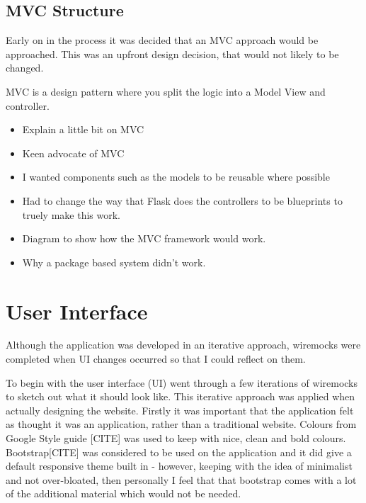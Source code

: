 

\subsection{MVC Structure}
Early on in the process it was decided that an MVC approach would be approached. This was an upfront design decision, that would not likely to be changed.

MVC is a design pattern where you split the logic into a Model View and controller.

\begin{itemize}
  \item Explain a little bit on MVC
  \item Keen advocate of MVC
  \item I wanted components such as the models to be reusable where possible
  \item Had to change the way that Flask does the controllers to be blueprints to truely make this work.
  \item Diagram to show how the MVC framework would work.
  \item Why a package based system didn't work.

\end{itemize}




\section{User Interface}
Although the application was developed in an iterative approach, wiremocks were completed when UI changes occurred so that I could reflect on them.

To begin with the user interface (UI) went through a few iterations of wiremocks to sketch out what it should look like.  This iterative approach was applied when actually designing the website. Firstly it was important that the application felt as thought it was an application, rather than a traditional website. Colours from Google Style guide [CITE] was used to keep with nice, clean and bold colours. Bootstrap[CITE] was considered to be used on the application and it did give a default responsive theme built in - however, keeping with the idea of minimalist and not over-bloated, then personally I feel that that bootstrap comes with a lot of the additional material which would not be needed.

